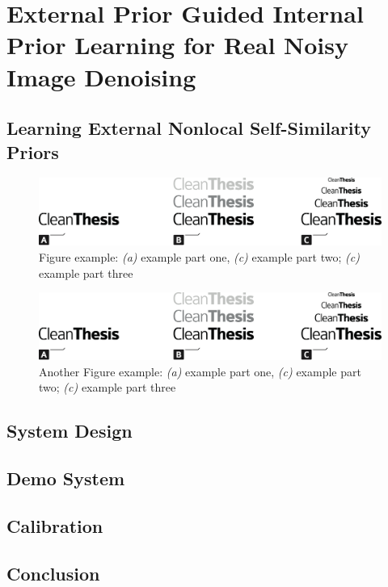%
\chapter{External Prior Guided Internal Prior Learning for Real Noisy Image Denoising}
\label{sec:system}




\section{Learning External Nonlocal Self-Similarity Priors}
\label{sec:system:intro}

\begin{figure}[htb]
	\includegraphics[width=\textwidth]{gfx/Clean-Thesis-Figure}
	\caption{Figure example: \textit{(a)} example part one, \textit{(c)} example part two; \textit{(c)} example part three}
	\label{fig:system:example1}
\end{figure}

\blindtext

\blindtext

\begin{figure}[htb]
	\includegraphics[width=\textwidth]{gfx/Clean-Thesis-Figure}
	\caption{Another Figure example: \textit{(a)} example part one, \textit{(c)} example part two; \textit{(c)} example part three}
	\label{fig:system:example2}
\end{figure}

\blindtext

\section{System Design}
\label{sec:system:design}

\blindtext

\section{Demo System}
\label{sec:system:Demo}

\blindtext

\section{Calibration}
\label{sec:system:calibration}

\blindtext

\section{Conclusion}
\label{sec:system:conclusion}

\blindtext
